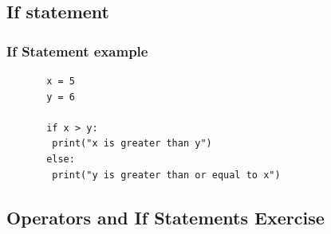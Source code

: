 \documentclass{beamer}
\begin{document}
\subsection{If statement}
\begin{frame}[fragile]
\frametitle{If Statement example}
  \begin{lstlisting}
       x = 5
       y = 6

       if x > y:
        print("x is greater than y")
       else:
        print("y is greater than or equal to x")
   \end{lstlisting}
\end{frame}


\subsection{Operators and If Statements Exercise}
\end{document}
